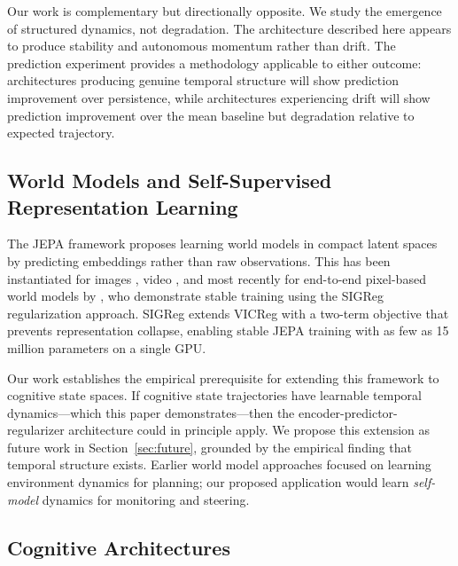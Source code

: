 \documentclass[twoside,11pt]{article}
\begin{document}
Our work is complementary but directionally opposite. We study the emergence of
structured dynamics, not degradation. The architecture described here appears to
produce stability and autonomous momentum rather than drift. The prediction
experiment provides a methodology applicable to either outcome: architectures
producing genuine temporal structure will show prediction improvement over
persistence, while architectures experiencing drift will show prediction
improvement over the mean baseline but degradation relative to expected
trajectory.

\subsection{World Models and Self-Supervised Representation Learning}
\label{sec:related-world-models}

The JEPA framework \citep{lecun2022path} proposes learning world models in
compact latent spaces by predicting embeddings rather than raw observations.
This has been instantiated for images \citep{assran2023ijepa}, video
\citep{bardes2024vjepa}, and most recently for end-to-end pixel-based world
models by \citet{maes2026lewm}, who demonstrate stable training using the
SIGReg regularization approach. SIGReg extends VICReg
\citep{bardes2022vicreg} with a two-term objective that prevents
representation collapse, enabling stable JEPA training with as few as 15
million parameters on a single GPU.

Our work establishes the empirical prerequisite for extending this framework to
cognitive state spaces. If cognitive state trajectories have learnable temporal
dynamics---which this paper demonstrates---then the encoder-predictor-regularizer
architecture could in principle apply. We propose this extension as future work
in Section~\ref{sec:future}, grounded by the empirical finding that temporal
structure exists. Earlier world model approaches \citep{ha2018world} focused on
learning environment dynamics for planning; our proposed application would learn
\emph{self-model} dynamics for monitoring and steering.

\subsection{Cognitive Architectures}
\label{sec:related-cognitive}
\end{document}
